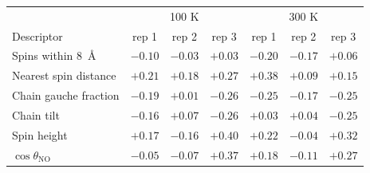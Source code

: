 \begin{tabular}{lcccccc}
\toprule
 & \multicolumn{3}{c}{100 K} & \multicolumn{3}{c}{300 K}\\
Descriptor & rep 1 & rep 2 & rep 3 & rep 1 & rep 2 & rep 3\\
\midrule
Spins within 8~\AA & $-0.10$ & $-0.03$ & $+0.03$ & $-0.20$ & $-0.17$ & $+0.06$\\
Nearest spin distance & $+0.21$ & $+0.18$ & $+0.27$ & $+0.38$ & $+0.09$ & $+0.15$\\
Chain gauche fraction & $-0.19$ & $+0.01$ & $-0.26$ & $-0.25$ & $-0.17$ & $-0.25$\\
Chain tilt & $-0.16$ & $+0.07$ & $-0.26$ & $+0.03$ & $+0.04$ & $-0.25$\\
Spin height & $+0.17$ & $-0.16$ & $+0.40$ & $+0.22$ & $-0.04$ & $+0.32$\\
$\cos\theta_\mathrm{NO}$ & $-0.05$ & $-0.07$ & $+0.37$ & $+0.18$ & $-0.11$ & $+0.27$\\
\bottomrule
\end{tabular}
